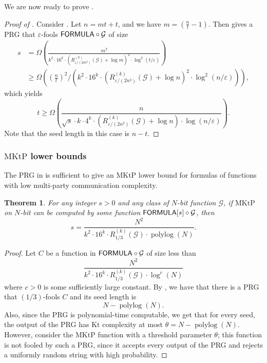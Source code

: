 \documentclass[10pt,a4paper]{article}
\newtheorem{theorem}{Theorem}
\newcommand{\polylog}{\operatorname{polylog}}
\newcommand{\MKtP}{\mathrm{MKtP}}
\newcommand{\FORMULA}{{\sf FORMULA}}
\begin{document}
	We are now ready to prove .
	
	\begin{proof}[Proof of ]
		Consider . Let $n=mt+t$, and we have $m=\left(\frac{n}{t}-1\right)$. Then 
		 gives a PRG that $\varepsilon$-fools $\FORMULA\circ\mathcal{G}$ of size
		\begin{align*}
			s &= \Omega\left( \frac{m^2}{k^2\cdot16^{k}\cdot\left(R^{(k)}_{\varepsilon/(2m^2)}(\mathcal{G})+\log m\right)^2\cdot\log^2(t/\varepsilon)}\right)\\
			&\geq \Omega\left(\left(\frac{n}{t}\right)^2/\left(k^2\cdot16^{k}\cdot\left(R^{(k)}_{\varepsilon/(2n^2)}(\mathcal{G})+\log n\right)^2\cdot\log^2(n/\varepsilon)\right)\right),
		\end{align*}
		which yields
		\[
			t\geq \Omega\left(\frac{n}{\sqrt{s}\cdot k\cdot4^{k}\cdot\left(R^{(k)}_{\varepsilon/(2n^2)}(\mathcal{G})+\log n\right)\cdot\log(n/\varepsilon)}\right).
		\]
		Note that the seed length in this case is $n-t$.
	\end{proof}

	\subsubsection{\texorpdfstring{$\MKtP$}{MKtP} lower bounds}
	
	The PRG in  is sufficient to give an $\MKtP$ lower bound for formulas of functions with low multi-party communication complexity.
	
	\begin{theorem}\label{thm:prg-mktp}
	    For any integer $s>0$ and any class of $N$-bit function $\mathcal{G}$, if $\MKtP$ on $N$-bit can be computed by some function $\FORMULA[s]\circ \mathcal{G}$, then
	    \[
            s= \frac{N^2}{k^2\cdot16^{k}\cdot R^{(k)}_{1/3}(\mathcal{G})\cdot \polylog(N)}.
	    \]
	\end{theorem}
	
	\begin{proof}
    	Let $C$ be a function in $\FORMULA\circ\mathcal{G}$ of size less than
    	\[
    	    \frac{N^2}{k^2\cdot16^{k}\cdot R^{(k)}_{1/3}(\mathcal{G})\cdot\log^c(N)}
    	\]
    	where $c>0$ is some sufficiently large constant. By , we have that there is a PRG that $(1/3)$-fools $C$ and its seed length is
    	\[
             N-\polylog(N).
    	\]
    	Also, since the PRG is polynomial-time computable, we get that for every seed, the output of the PRG has $\mathrm{Kt}$ complexity at most $\theta=N-\polylog(N)$. However, consider the $\MKtP$ function with a threshold parameter $\theta$; this function is not fooled by such a PRG, since it accepts every output of the PRG and rejects a uniformly random string with high probability. 
    \end{proof}
    
\end{document}
